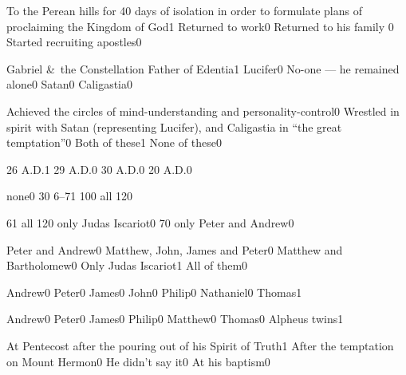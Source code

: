 {To the Perean hills for 40 days of isolation in order to formulate plans of proclaiming the Kingdom of God}{1}
{Returned to work}{0}
{Returned to his family }{0}
{Started recruiting apostles}{0}
\qstop

{Gabriel \&\ the Constellation Father of Edentia}{1}
{Lucifer}{0}
{No-one --- he remained alone}{0}
{Satan}{0}
{Caligastia}{0}
\qstop

{Achieved the circles of mind-understanding and personality-control}{0}
{Wrestled in spirit with Satan (representing Lucifer), and Caligastia in ``the great temptation''}{0}
{Both of these}{1}
{None of these}{0}
\qstop

{26 A.D.}{1}
{29 A.D.}{0}
{30 A.D.}{0}
{20 A.D.}{0}
\qstop



{none}{0}
{3}{0}
{6--7}{1}
{10}{0}
{all 12}{0}
\qstop


{6}{1}
{all 12}{0}
{only Judas Iscariot}{0}
{7}{0}
{only Peter and Andrew}{0}
\qstop

{Peter and Andrew}{0}
{Matthew, John, James and Peter}{0}
{Matthew and Bartholomew}{0}
{Only Judas Iscariot}{1}
{All of them}{0}
\qstop

{Andrew}{0}
{Peter}{0}
{James}{0}
{John}{0}
{Philip}{0}
{Nathaniel}{0}
{Thomas}{1}
\qstop

{Andrew}{0}
{Peter}{0}
{James}{0}
{Philip}{0}
{Matthew}{0}
{Thomas}{0}
{Alpheus twins}{1}
\qstop



{At Pentecost after the pouring out of his Spirit of Truth}{1}
{After the temptation on Mount Hermon}{0}
{He didn't say it}{0}
{At his baptism}{0}
\qstop

